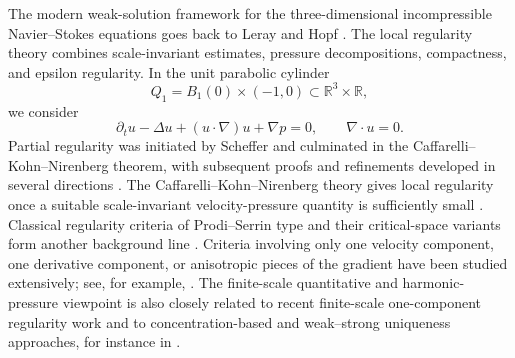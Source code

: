 \documentclass[11pt]{article}
\numberwithin{equation}{section}
\theoremstyle{plain}
\theoremstyle{definition}
\theoremstyle{remark}
\newcommand{\R}{\mathbb R}
\begin{document}
The modern weak-solution framework for the three-dimensional incompressible Navier--Stokes equations goes back to Leray and Hopf \cite{Leray1934,Hopf1951}.  The local regularity theory combines scale-invariant estimates, pressure decompositions, compactness, and epsilon regularity.  In the unit parabolic cylinder
\[
        Q_1=B_1(0)\times(-1,0)\subset \R^3\times\R,
\]
we consider
\begin{equation}\label{pI:eq:NS}
        \partial_tu-\Delta u+(u\cdot\nabla)u+\nabla p=0,
        \qquad
        \nabla\cdot u=0.
\end{equation}
Partial regularity was initiated by Scheffer and culminated in the Caffarelli--Kohn--Nirenberg theorem, with subsequent proofs and refinements developed in several directions \cite{Scheffer1976,Scheffer1977,CKN1982,Struwe1988,Lin1998,LadyzhenskayaSeregin1999,ChoeLewis2000,Vasseur2007,Seregin2007Local,Seregin2015}.  The Caffarelli--Kohn--Nirenberg theory gives local regularity once a suitable scale-invariant velocity-pressure quantity is sufficiently small \cite{CKN1982,Lin1998}.  Classical regularity criteria of Prodi--Serrin type and their critical-space variants form another background line \cite{Prodi1959,Serrin1962,KozonoSohr1997,EscauriazaSereginSverak2003,GustafsonKangTsai2007}.  Criteria involving only one velocity component, one derivative component, or anisotropic pieces of the gradient have been studied extensively; see, for example, \cite{KukavicaZiane2006,KukavicaZiane2007,PenelPokorny2004,ZhouPokorny2009,CaoTiti2011,CheminZhang2016,CheminZhangZhang2017,KukavicaRusinZiane2017,HanLeiLiZhao2019,KangNguyen2023}.  The finite-scale quantitative and harmonic-pressure viewpoint is also closely related to recent finite-scale one-component regularity work and to concentration-based and weak--strong uniqueness approaches, for instance in \cite{JiaSverak2014,BarkerPrange2021,AlbrittonBarkerPrange2023,Yu2026HarmonicPressure}.
\end{document}

